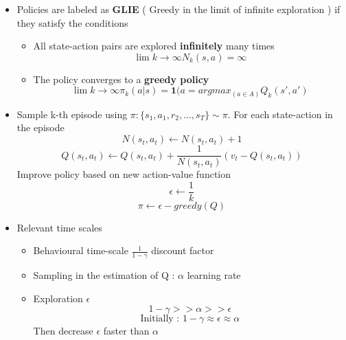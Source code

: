 \documentclass[12pt]{article} %
\begin{document}
\begin{itemize}
\item Policies are labeled as \textbf{GLIE} ( Greedy in the limit of infinite exploration ) if they satisfy the conditions
\begin{itemize}
\item All state-action pairs are explored \textbf{infinitely } many times 
$$ \lim{k \to \infty} N_k(s,a) = \infty$$
\item The policy converges to a \textbf{greedy policy} 
$$ \lim{k \to \infty} \pi_k(a|s) = \bm{1}(a= argmax_{(a \in A)}Q_k(s',a')$$
\end{itemize}

\item Sample k-th episode using $\pi : \{ s_1,a_1,r_2,...,s_T\} \sim \pi$. For each state-action in the episode 
$$ N(s_t,a_t) \leftarrow N(s_t,a_t)+1$$
$$ Q(s_t,a_t) \leftarrow Q(s_t,a_t)+ \frac{1}{N(s_t,a_t)}(v_t - Q(s_t,a_t))$$
Improve policy based on new action-value function 
$$ \epsilon \leftarrow \frac{1}{k}$$
$$ \pi \leftarrow \epsilon-greedy(Q)$$  

\begin{center}
\end{center}

\item Relevant time scales
\begin{itemize}
\item Behavioural time-scale $\frac{1}{1-\gamma}$ discount factor
\item Sampling in the estimation of Q : $\alpha$ learning rate
\item Exploration $\epsilon$
$$ 1-\gamma >> \alpha >> \epsilon$$
$$ \text{Initially : } 1-\gamma \approx \epsilon \approx \alpha$$
Then decrease $\epsilon$ faster than $\alpha$
\end{itemize}
\end{itemize}
\end{document}
